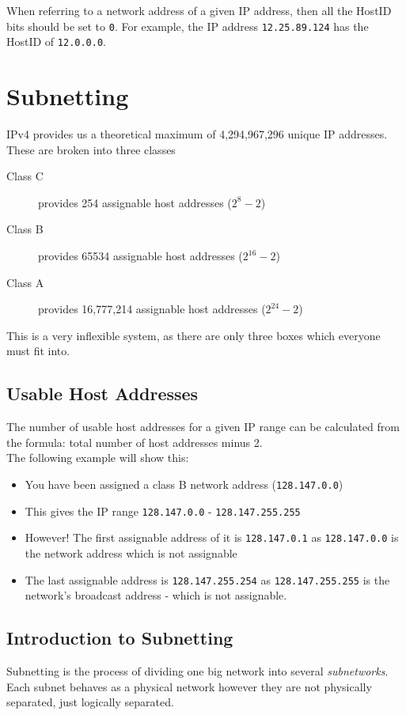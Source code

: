 When referring to a network address of a given IP address, then all the HostID bits should be set to \verb|0|. For example, the IP address \verb|12.25.89.124| has the HostID of \verb|12.0.0.0|.

\section{Subnetting}
IPv4 provides us a theoretical maximum of 4,294,967,296 unique IP addresses. These are broken into three classes
\begin{description}
    \item[Class C] provides 254 assignable host addresses ($2^8 - 2$)
    \item[Class B] provides 65534 assignable host addresses ($2^{16} - 2$)
    \item[Class A] provides 16,777,214 assignable host addresses ($2^{24} - 2$)
\end{description} 

This is a very inflexible system, as there are only three boxes which everyone must fit into.
\subsection{Usable Host Addresses}
The number of usable host addresses for a given IP range can be calculated from the formula: total number of host addresses minus 2.\\

The following example will show this:
\begin{itemize}
    \item You have been assigned a class B network address (\verb|128.147.0.0|)
    \item This gives the IP range \verb|128.147.0.0| - \verb|128.147.255.255|
    \item However! The first assignable address of it is \verb|128.147.0.1| as \verb|128.147.0.0| is the network address which is not assignable
    \item The last assignable address is \verb|128.147.255.254| as \verb|128.147.255.255| is the network's broadcast address - which is not assignable.
\end{itemize}

\subsection{Introduction to Subnetting}
Subnetting is the process of dividing one big network into several \textit{subnetworks}. Each subnet behaves as a physical network however they are not physically separated, just logically separated.\\

